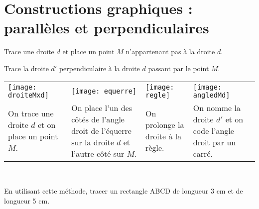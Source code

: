 \section{Constructions graphiques : parallèles et perpendiculaires}

\begin{methode*1}

\begin{exemple*1}
Trace une droite $d$ et place un point $M$ n'appartenant pas à la droite $d$.

Trace la droite $d'$ perpendiculaire à la droite $d$ passant par le point $M$. \\[0.75em]

\begin{tabularx}{\textwidth}{X|X|X|X}
\texttt{[image: droiteMxd]} &  \texttt{[image: equerre]} & \texttt{[image: regle]} &  \texttt{[image: angledMd]}\\ 
 On trace une droite $d$ et on place un point $M$. & On place l'un des côtés de l'angle droit de l'équerre sur la droite $d$ et l'autre côté sur $M$.
 & On prolonge la droite à la règle. & On nomme la droite $d'$ et on code l'angle droit par un carré.\\

\end{tabularx} \\
 
 \end{exemple*1}


\exercice

En utilisant cette méthode, tracer un rectangle ABCD de longueur 3 cm et de longueur 5 cm.


 
\end{methode*1}

\newpage


